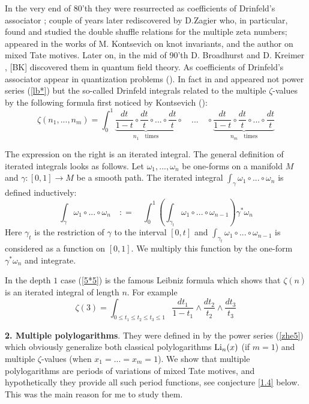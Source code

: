 \documentclass[10pt]{article}
\begin{document}
In the very end of 80'th they were resurrected as coefficients of 
Drinfeld's associator \cite{Dr}; 
couple of years later 
rediscovered by D.Zagier \cite{Z} who, in particular,  found and studied 
the double shuffle relations for the multiple zeta numbers; 
 appeared in the works of 
M. Kontsevich \cite{K1} on knot invariants,  and the author \cite{G0,G1}
 on mixed Tate motives. Later on, in the mid of 90'th 
D. Broadhurst and D. Kreimer \cite{Kr}, [BK] discovered them 
in quantum field theory. As coefficients of Drinfeld's associator appear
 in quantization problems (\cite{K2}).  
In fact in \cite{Dr} and \cite{K1} appeared  not power
series (\ref{lb*}) but the so-called Drinfeld integrals related to 
the multiple $\zeta$-values 
by the following formula first noticed by Kontsevich (\cite{K1}):
\begin{equation} \label{5*5}
{  \zeta}(n_{1},...,n_{m})  =  
 \int_{0}^{1} \underbrace {\frac{dt}{1-t}  \circ \frac{dt}{t} \circ
... \circ 
\frac{dt}{t} }
_{ n_{1} \quad  \mbox {times}} \circ \quad
... \quad \circ \underbrace 
{\frac{dt}{1-t} \circ \frac{dt}{t} \circ ...
\circ \frac{dt}{t}}_{ n_{m} \quad \mbox  {times}}
\end{equation}

The expression on the right is an iterated integral. The general definition of iterated integrals 
looks as follows. 
Let $\omega_{1},...,\omega_{n}$ be one-forms on a manifold $M$ and $\gamma : [0,1] \rightarrow M$ be a smooth path. 
The iterated integral $\int_{\gamma} \omega_{1} \circ ... \circ \omega_{n}$ 
is defined inductively:
\begin{equation} \label{h1}
\int_{\gamma} \omega_{1} \circ ... \circ \omega_{n} \quad : = \quad \int_{0}^{1}(\int
_{\gamma_{t}} \omega_{1} \circ ... \circ \omega_{n-1
}) \gamma^{*} \omega_{n}
\end{equation}
Here $ \gamma_{t}$ is the restriction of $\gamma$ to the interval $[0,t]$
and
$\int_{\gamma_{t}} \omega_{1} \circ ... \circ \omega_
{n-1}$ is considered as a function on $[0,1]$. We multiply this function by the
 one-form $\gamma^{*} \omega_{n}$  and integrate.


In the depth $1$ case (\ref{5*5}) is the famous Leibniz formula which shows that $\zeta(n)$ 
is an iterated integral of length $n$. For example
$$
\zeta(3) = \int_{0 \leq t_1 \leq t_2 \leq t_3 \leq 1}\frac{dt_1}{1-t_1}\wedge \frac{dt_2}{t_2}\wedge \frac{dt_3}{t_3}
$$


{\bf 2. Multiple polylogarithms}. They were defined in \cite{G0,G1} by the power series (\ref{zhe5}) 
which obviously generalize both
classical polylogarithms ${\rm Li}_n(x)$ (if $m=1$) 
and  multiple $\zeta$-values (when $x_1 =  ... = x_m =1$). 
We show that multiple polylogarithms are periods of 
 variations of mixed Tate motives, 
and hypothetically they provide  all such period functions, see conjecture \ref{1.4} below. 
This was the main reason for me to study them. 
 
\end{document}
